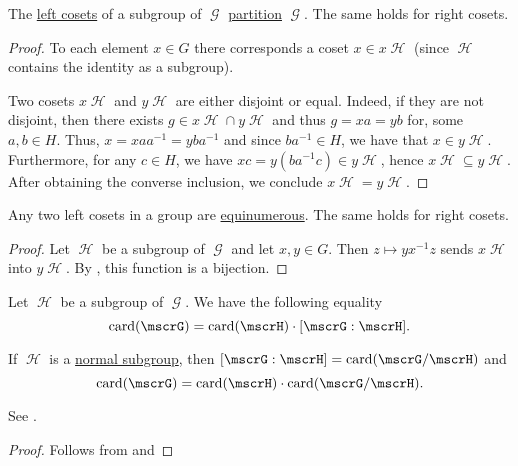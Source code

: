 \begin{lemma}\label{thm:group_coset_partition}
  The \hyperref[def:group_cosets]{left cosets} of a subgroup of \( \mscrG \) \hyperref[def:set_partition]{partition} \( \mscrG \). The same holds for right cosets.
\end{lemma}
\begin{proof}
  To each element \( x \in G \) there corresponds a coset \( x \in x\mscrH \) (since \( \mscrH \) contains the identity as a subgroup).

  Two cosets \( x\mscrH \) and \( y\mscrH \) are either disjoint or equal. Indeed, if they are not disjoint, then there exists \( g \in x\mscrH \cap y\mscrH \) and thus \( g = xa = yb \) for, some \( a, b \in H \). Thus, \( x = x a a^{-1} = y b a^{-1} \) and since \( b a^{-1} \in H \), we have that \( x \in y\mscrH \). Furthermore, for any \( c \in H \), we have \( xc = y(b a^{-1} c) \in y\mscrH \), hence \( x\mscrH \subseteq y\mscrH \). After obtaining the converse inclusion, we conclude \( x\mscrH = y\mscrH \).
\end{proof}

\begin{lemma}\label{thm:group_coset_bijection}
  Any two left cosets in a group are \hyperref[def:equinumerosity]{equinumerous}. The same holds for right cosets.
\end{lemma}
\begin{proof}
  Let \( \mscrH \) be a subgroup of \( \mscrG \) and let \( x, y \in G \). Then \( z \mapsto y x^{-1} z \) sends \( x\mscrH \) into \( y\mscrH \). By , this function is a bijection.
\end{proof}

\begin{theorem}\label{thm:lagranges_theorem_for_groups}
  Let \( \mscrH \) be a subgroup of \( \mscrG \). We have the following equality
  \begin{equation}\label{eq:thm:lagranges_theorem_for_groups/index}
    \card(\mscrG) = \card(\mscrH) \cdot [\mscrG : \mscrH].
  \end{equation}

  If \( \mscrH \) is a \hyperref[def:normal_subgroup]{normal subgroup}, then \( [\mscrG : \mscrH] = \card(\mscrG / \mscrH) \) and
  \begin{equation}\label{eq:thm:lagranges_theorem_for_groups/card}
    \card(\mscrG) = \card(\mscrH) \cdot \card(\mscrG / \mscrH).
  \end{equation}

  See .
\end{theorem}
\begin{proof}
  Follows from  and 
\end{proof}

